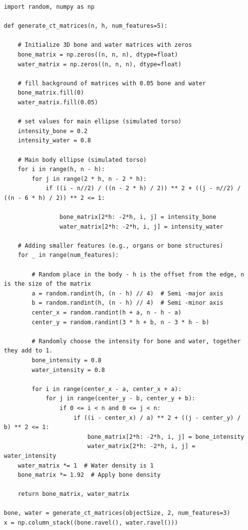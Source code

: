 \begin{verbatim}
import random, numpy as np

def generate_ct_matrices(n, h, num_features=5):

    # Initialize 3D bone and water matrices with zeros
    bone_matrix = np.zeros((n, n, n), dtype=float)
    water_matrix = np.zeros((n, n, n), dtype=float)

    # fill background of matrices with 0.05 bone and water 
    bone_matrix.fill(0)
    water_matrix.fill(0.05)
    
    # set values for main ellipse (simulated torso)
    intensity_bone = 0.2
    intensity_water = 0.8
    
    # Main body ellipse (simulated torso)
    for i in range(h, n - h):
        for j in range(2 * h, n - 2 * h):
            if ((i - n//2) / ((n - 2 * h) / 2)) ** 2 + ((j - n//2) / ((n - 6 * h) / 2)) ** 2 <= 1:
                
                bone_matrix[2*h: -2*h, i, j] = intensity_bone
                water_matrix[2*h: -2*h, i, j] = intensity_water

    # Adding smaller features (e.g., organs or bone structures)
    for _ in range(num_features):
        
        # Random place in the body - h is the offset from the edge, n is the size of the matrix
        a = random.randint(h, (n - h) // 4)  # Semi -major axis
        b = random.randint(h, (n - h) // 4)  # Semi -minor axis
        center_x = random.randint(h + a, n - h - a)
        center_y = random.randint(3 * h + b, n - 3 * h - b)

        # Randomly choose the intensity for bone and water, together they add to 1. 
        bone_intensity = 0.8
        water_intensity = 0.8
        
        for i in range(center_x - a, center_x + a):
            for j in range(center_y - b, center_y + b):
                if 0 <= i < n and 0 <= j < n:
                    if ((i - center_x) / a) ** 2 + ((j - center_y) / b) ** 2 <= 1:
                        bone_matrix[2*h: -2*h, i, j] = bone_intensity
                        water_matrix[2*h: -2*h, i, j] = water_intensity
    water_matrix *= 1  # Water density is 1
    bone_matrix *= 1.92  # Apply bone density
    
    return bone_matrix, water_matrix

bone, water = generate_ct_matrices(objectSize, 2, num_features=3)
x = np.column_stack((bone.ravel(), water.ravel()))
\end{verbatim}

